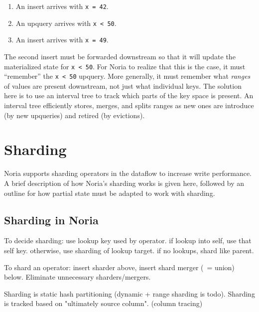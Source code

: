 \begin{enumerate}
  \item An insert arrives with \texttt{x = 42}.
  \item An upquery arrives with \texttt{x < 50}.
  \item An insert arrives with \texttt{x = 49}.
\end{enumerate}

The second insert must be forwarded downstream so that it will update the
materialized state for \texttt{x < 50}. For Noria to realize that this is the
case, it must ``remember'' the \texttt{x < 50} upquery. More generally, it must
remember what \emph{ranges} of values are present downstream, not just what
individual keys. The solution here is to use an interval tree to track which
parts of the key space is present. An interval tree efficiently stores, merges,
and splits ranges as new ones are introduce (by new upqueries) and retired (by
evictions).

\section{Sharding}

Noria supports sharding operators in the dataflow to increase write performance.
A brief description of how Noria's sharding works is given here, followed by an
outline for how partial state must be adapted to work with sharding.

\subsection{Sharding in Noria}

\begin{inprogress}
  To decide sharding: use lookup key used by operator. if lookup into self, use
  that self key. otherwise, use sharding of lookup target. if no lookups, shard
  like parent.
\end{inprogress}

\begin{inprogress}
  To shard an operator: insert sharder above, insert shard merger (~= union)
  below. Eliminate unnecessary sharders/mergers.
\end{inprogress}

\begin{inprogress}
  Sharding is static hash partitioning (dynamic + range sharding is todo).
  Sharding is tracked based on "ultimately source column". (column tracing)
\end{inprogress}

